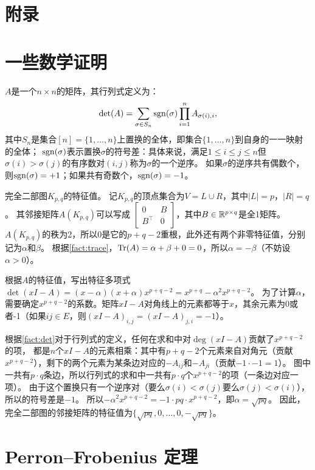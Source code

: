 \section*{附录}
\appendix
\section{一些数学证明}

\begin{fact}[莱布尼兹公式]\label{fact:det}
    $A$是一个$n\times n$的矩阵，其行列式定义为：
    \[
    \det(A)=\sum_{\sigma\in S_n}\mathrm{sgn}(\sigma)\prod_{i=1}^n A_{\sigma(i),i},
    \]
    其中$S_n$是集合$[n]=\{1,\dots,n\}$上置换的全体，即集合$\{1,\dots,n\}$到自身的一一映射的全体；
    $\mathrm{sgn}(\sigma)$表示置换$\sigma$的符号差：具体来说，满足$1\le i\le j\le n$但$\sigma(i)>\sigma(j)$的有序数对$(i,j)$称为$\sigma$的一个逆序。
    如果$\sigma$的逆序共有偶数个，则$\mathrm{sgn}(\sigma)=+1$；如果共有奇数个，$\mathrm{sgn}(\sigma)=-1$。
\end{fact}

\example 完全二部图$K_{p,q}$的特征值。
\label{eigenvalue of binary}
记$K_{p,q}$的顶点集合为$V=L\cup R$，其中$|L|=p$，$|R|=q$。
其邻接矩阵$A(K_{p,q})$可以写成
$\begin{bmatrix} 0 & B \\ B^\top & 0 \end{bmatrix}$，其中$B\in\mathbb{R}^{p\times q}$是全1矩阵。
$A(K_{p,q})$的秩为2，所以0是它的$p+q-2$重根，此外还有两个非零特征值，分别记为$\alpha$和$\beta$。
根据\cref{fact:trace}，$\mathrm{Tr}(A)=\alpha+\beta+0=0$，所以$\alpha=-\beta$（不妨设$\alpha>0$）。

根据$A$的特征值，写出特征多项式$\det(xI-A)=(x-\alpha)(x+\alpha)x^{p+q-2}=x^{p+q}-\alpha^2x^{p+q-2}$。
为了计算$\alpha$，需要确定$x^{p+q-2}$的系数。矩阵$xI-A$对角线上的元素都等于$x$，其余元素为0或者-1（如果$ij\in E$，则$(xI-A)_{i,j}=(xI-A)_{j,i}=-1$）。

根据\cref{fact:det}对于行列式的定义，任何在求和中对$\deg(xI-A)$贡献了$x^{p+q-2}$的项，
都是$n$个$xI-A$的元素相乘：其中有$p+q-2$个元素来自对角元（贡献$x^{p+q-2}$），剩下的两个元素为某条边对应的$-A_{ij}$和$-A_{ji}$（贡献$-1\cdot -1=1$）。
图中一共有$p\cdot q$条边，所以行列式的求和中一共有$p\cdot q$个$x^{p+q-2}$的项（一条边对应一项）。
由于这个置换只有一个逆序对（要么$\sigma(i)<\sigma(j)$要么$\sigma(j)<\sigma(i)$），所以的符号差是$-1$。
所以$-\alpha^2x^{p+q-2}=-1\cdot pq\cdot x^{p+q-2}$，即$\alpha=\sqrt{pq}$。
因此，完全二部图的邻接矩阵的特征值为$\{\sqrt{pq},0,\dots,0,-\sqrt{pq}\}$。

\section{Perron--Frobenius 定理}

